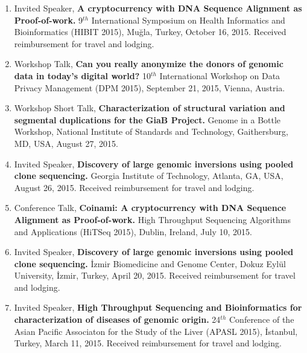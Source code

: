 
\begin{enumerate}
\item
  Invited Speaker,
  {\bf A cryptocurrency with DNA Sequence Alignment as Proof-of-work.}
  9$^{th}$ International Symposium on Health Informatics and Bioinformatics (HIBIT 2015),
   Muğla, Turkey, October 16, 2015. Received reimbursement for travel and lodging.
\item
  Workshop Talk, 
  {\bf Can you really anonymize the donors of genomic data in today's digital world?}
  10$^{th}$ International Workshop on Data Privacy Management (DPM 2015), 
  September 21, 2015, Vienna, Austria.
\item
  Workshop Short Talk, 
  {\bf Characterization of structural variation and segmental duplications for the GiaB Project.}
  Genome in a Bottle Workshop, National Institute of Standards and Technology, Gaithersburg, MD, USA,
  August 27, 2015.
\item
  Invited Speaker, 
  {\bf Discovery of large genomic inversions using pooled clone sequencing.}
  Georgia Institute of Technology, Atlanta, GA, USA, August 26, 2015. Received reimbursement for travel and lodging.
\item
  Conference Talk, 
  {\bf Coinami: A cryptocurrency with DNA Sequence Alignment as Proof-of-work.}
  High Throughput Sequencing Algorithms and Applications (HiTSeq 2015), Dublin, Ireland, July 10, 2015.
\item
  Invited Speaker, 
  {\bf Discovery of large genomic inversions using pooled clone sequencing.}
  İzmir Biomedicine and Genome Center, Dokuz Eylül University, İzmir, Turkey, April 20, 2015. Received reimbursement for travel and lodging.
\item
  Invited Speaker, 
  {\bf High Throughput Sequencing and Bioinformatics for characterization of diseases of genomic origin.}
  24$^{th}$ Conference of the Asian Pacific Associaton for the Study of the Liver (APASL 2015), İstanbul, Turkey, March 11, 2015. Received reimbursement for travel and lodging.

\end{enumerate}
